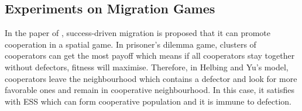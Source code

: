 \subsection{Experiments on Migration Games}
In the paper of \citet{helbing2009outbreak}, success-driven migration is proposed that it can promote cooperation in a spatial game. In prisoner's dilemma game, clusters of cooperators can get the most payoff which means if all cooperators stay together without defectors, fitness will maximise. Therefore, in Helbing and Yu's model, cooperators leave the neighbourhood which contains a defector and look for more favorable ones and remain in cooperative neighbourhood. In this case, it satisfies with ESS which can form cooperative population and it is immune to defection.










